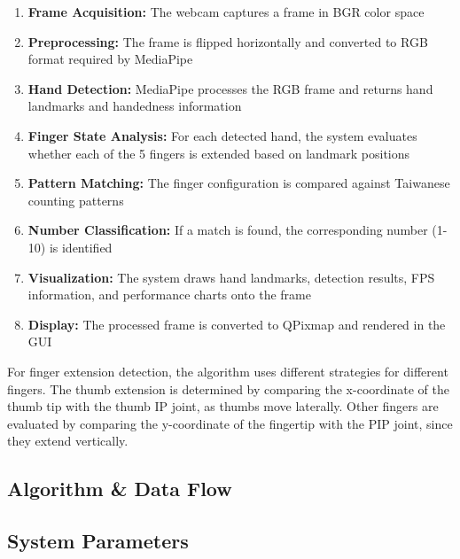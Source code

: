 \documentclass{article}
\begin{document}
\begin{enumerate}
	\item \textbf{Frame Acquisition:} The webcam captures a frame in BGR color space
	\item \textbf{Preprocessing:} The frame is flipped horizontally and converted to RGB format required by MediaPipe
	\item \textbf{Hand Detection:} MediaPipe processes the RGB frame and returns hand landmarks and handedness information
	\item \textbf{Finger State Analysis:} For each detected hand, the system evaluates whether each of the 5 fingers is extended based on landmark positions
	\item \textbf{Pattern Matching:} The finger configuration is compared against Taiwanese counting patterns
	\item \textbf{Number Classification:} If a match is found, the corresponding number (1-10) is identified
	\item \textbf{Visualization:} The system draws hand landmarks, detection results, FPS information, and performance charts onto the frame
	\item \textbf{Display:} The processed frame is converted to QPixmap and rendered in the GUI
\end{enumerate}

For finger extension detection, the algorithm uses different strategies for different fingers. The thumb extension is determined by comparing the x-coordinate of the thumb tip with the thumb IP joint, as thumbs move laterally. Other fingers are evaluated by comparing the y-coordinate of the fingertip with the PIP joint, since they extend vertically.

\subsection{Algorithm \& Data Flow}

\subsection{System Parameters}
\end{document}
